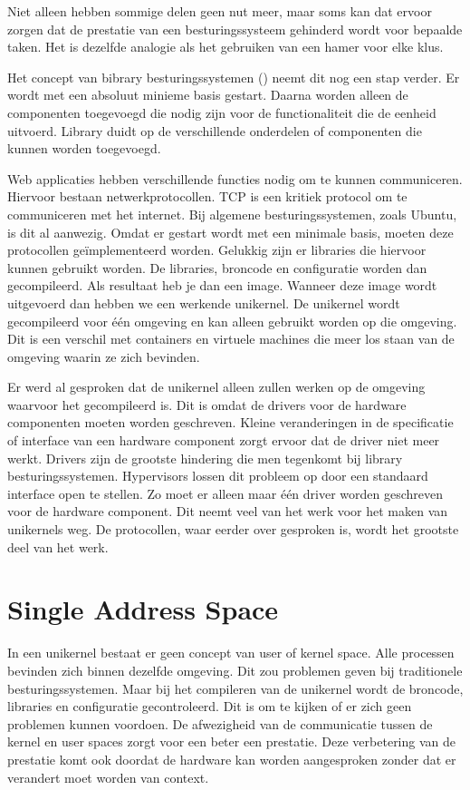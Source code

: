 \documentclass[pdftex,a4paper,12pt,twoside]{report}
\begin{document}
Niet alleen hebben sommige delen geen nut meer, maar soms kan dat ervoor zorgen dat de prestatie van een besturingssysteem gehinderd wordt voor bepaalde taken. Het is dezelfde analogie als het gebruiken van een hamer voor elke klus.

Het concept van bibrary besturingssystemen (\cite{madhavapeddy_unikernels_2013}) neemt dit nog een stap verder. Er wordt met een absoluut minieme basis gestart. Daarna worden alleen de componenten toegevoegd die nodig zijn voor de functionaliteit die de eenheid uitvoerd. Library duidt op de verschillende onderdelen of componenten die kunnen worden toegevoegd.

Web applicaties hebben verschillende functies nodig om te kunnen communiceren. Hiervoor bestaan netwerkprotocollen. TCP is een kritiek protocol om te communiceren met het internet. Bij algemene besturingssystemen, zoals Ubuntu, is dit al aanwezig. Omdat er gestart wordt met een minimale basis, moeten deze protocollen geïmplementeerd worden. Gelukkig zijn er libraries die hiervoor kunnen gebruikt worden. De libraries, broncode en configuratie worden dan gecompileerd. Als resultaat heb je dan een image. Wanneer deze image wordt uitgevoerd dan hebben we een werkende unikernel. De unikernel wordt gecompileerd voor één omgeving en kan alleen gebruikt worden op die omgeving. Dit is een verschil met containers en virtuele machines die meer los staan van de omgeving waarin ze zich bevinden.

Er werd al gesproken dat de unikernel alleen zullen werken op de omgeving waarvoor het gecompileerd is. Dit is omdat de drivers voor de hardware componenten moeten worden geschreven. Kleine veranderingen in de specificatie of interface van een hardware component zorgt ervoor dat de driver niet meer werkt. Drivers zijn de grootste hindering die men tegenkomt bij library besturingssystemen. Hypervisors lossen dit probleem op door een standaard interface open te stellen. Zo moet er alleen maar één driver worden geschreven voor de hardware component. Dit neemt veel van het werk voor het maken van unikernels weg. De protocollen, waar eerder over gesproken is, wordt het grootste deel van het werk.

\section{Single Address Space}

In een unikernel bestaat er geen concept van user of kernel space. Alle processen bevinden zich binnen dezelfde omgeving. Dit zou problemen geven bij traditionele besturingssystemen. Maar bij het compileren van de unikernel wordt de broncode, libraries en configuratie gecontroleerd. Dit is om te kijken of er zich geen problemen kunnen voordoen. De afwezigheid van de communicatie tussen de kernel en user spaces zorgt voor een beter een prestatie. Deze verbetering van de prestatie komt ook doordat de hardware kan worden aangesproken zonder dat er verandert moet worden van context.
\end{document}
